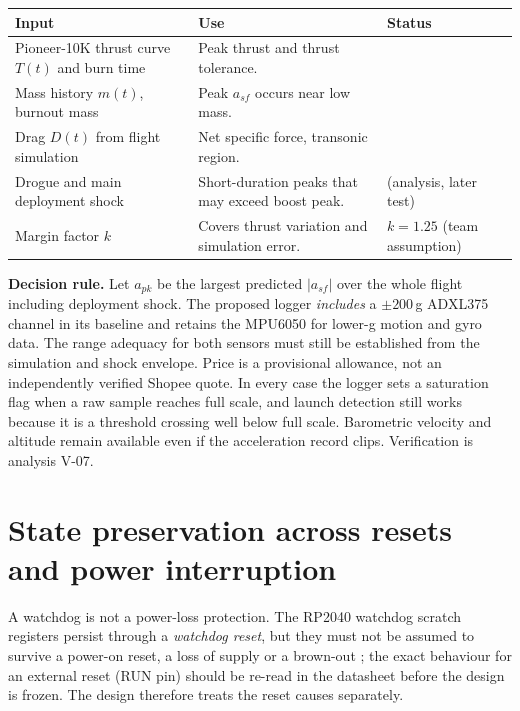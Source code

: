 \small
\begingroup
{}
\begin{tabularx}{\linewidth}{@{}L{42mm}Y L{34mm}@{}}
\toprule{}\textbf{Input}&\textbf{Use}&\textbf{Status}\\\midrule
Pioneer-10K thrust curve $T(t)$ and burn time & Peak thrust and thrust tolerance. & \\
Mass history $m(t)$, burnout mass & Peak $a_{sf}$ occurs near low mass. & \\
Drag $D(t)$ from flight simulation & Net specific force, transonic region. & \\
Drogue and main deployment shock & Short-duration peaks that may exceed boost peak. &  (analysis, later test)\\
Margin factor $k$ & Covers thrust variation and simulation error. & $k=1.25$ (team assumption)\\
\bottomrule
\end{tabularx}
\endgroup %
\normalsize

\textbf{Decision rule.} Let $a_{pk}$ be the largest predicted $|a_{sf}|$ over the whole flight including deployment shock. The proposed logger \emph{includes} a $\pm200$\,g ADXL375 channel in its baseline and retains the MPU6050 for lower-g motion and gyro data. The range adequacy for both sensors must still be established from the simulation and shock envelope. Price is a provisional allowance, not an independently verified Shopee quote. In every case the logger sets a saturation flag when a raw sample reaches full scale, and launch detection still works because it is a threshold crossing well below full scale. Barometric velocity and altitude remain available even if the acceleration record clips. Verification is analysis V-07.

\section{State preservation across resets and power interruption}
\label{sec:state}
A watchdog is not a power-loss protection. The RP2040 watchdog scratch registers persist through a \emph{watchdog reset}, but they must not be assumed to survive a power-on reset, a loss of supply or a brown-out \cite{rp2040ds}; the exact behaviour for an external reset (RUN pin) should be re-read in the datasheet before the design is frozen. The design therefore treats the reset causes separately.

